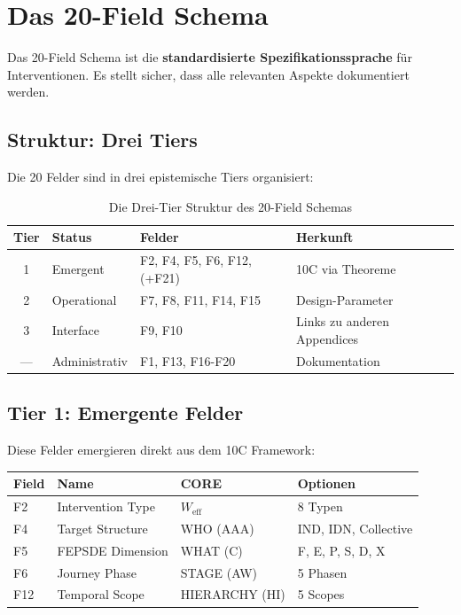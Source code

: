 
\section{Das 20-Field Schema}
\label{sec:17-schema}

Das 20-Field Schema ist die \textbf{standardisierte Spezifikationssprache} für Interventionen. Es stellt sicher, dass alle relevanten Aspekte dokumentiert werden.

\subsection{Struktur: Drei Tiers}

Die 20 Felder sind in drei epistemische Tiers organisiert:

\begin{table}[htbp]
\centering
\caption{Die Drei-Tier Struktur des 20-Field Schemas}
\label{tab:17-tiers}
\renewcommand{\arraystretch}{1.3}
\small
\begin{tabular}{@{}clll@{}}
\toprule
\textbf{Tier} & \textbf{Status} & \textbf{Felder} & \textbf{Herkunft} \\
\midrule
1 & Emergent & F2, F4, F5, F6, F12, (+F21) & 10C via Theoreme \\
2 & Operational & F7, F8, F11, F14, F15 & Design-Parameter \\
3 & Interface & F9, F10 & Links zu anderen Appendices \\
--- & Administrativ & F1, F13, F16-F20 & Dokumentation \\
\bottomrule
\end{tabular}
\end{table}


\subsection{Tier 1: Emergente Felder}

Diese Felder emergieren direkt aus dem 10C Framework:

\begin{center}
\renewcommand{\arraystretch}{1.3}
\begin{tabular}{@{}llll@{}}
\toprule
\textbf{Field} & \textbf{Name} & \textbf{CORE} & \textbf{Optionen} \\
\midrule
F2 & Intervention Type & $W_{\text{eff}}$ & 8 Typen \\
F4 & Target Structure & WHO (AAA) & IND, IDN, Collective \\
F5 & FEPSDE Dimension & WHAT (C) & F, E, P, S, D, X \\
F6 & Journey Phase & STAGE (AW) & 5 Phasen \\
F12 & Temporal Scope & HIERARCHY (HI) & 5 Scopes \\
\bottomrule
\end{tabular}
\end{center}


